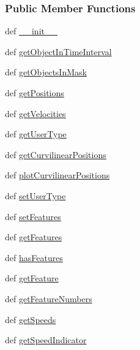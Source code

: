 \subsubsection*{Public Member Functions}
\begin{DoxyCompactItemize}
\item 
def \hyperlink{classmoving_1_1MovingObject_af5eb39b451844c27efa5a9afe6b442b0}{\-\_\-\-\_\-init\-\_\-\-\_\-}
\item 
def \hyperlink{classmoving_1_1MovingObject_a473f6a4eca09148db88439bd062a6802}{get\-Object\-In\-Time\-Interval}
\item 
def \hyperlink{classmoving_1_1MovingObject_a8725b010f6aa48dbc0b07b6714f15403}{get\-Objects\-In\-Mask}
\item 
def \hyperlink{classmoving_1_1MovingObject_a9c70c0c7dc3c938e70e6e4434f61b167}{get\-Positions}
\item 
def \hyperlink{classmoving_1_1MovingObject_a95c34c471a8f4f001e009c9ea5aed13b}{get\-Velocities}
\item 
def \hyperlink{classmoving_1_1MovingObject_a757700e17e0b75bb01e6b7324a3d5bdc}{get\-User\-Type}
\item 
def \hyperlink{classmoving_1_1MovingObject_aa589676e00e70ce8acafca9c3fa48150}{get\-Curvilinear\-Positions}
\item 
def \hyperlink{classmoving_1_1MovingObject_a8bff58ea20311713f7d08e1ed5482af6}{plot\-Curvilinear\-Positions}
\item 
def \hyperlink{classmoving_1_1MovingObject_a5b1caff7786c65076d09d79caec37f64}{set\-User\-Type}
\item 
def \hyperlink{classmoving_1_1MovingObject_aac41a9e6cf22cb70e5c9928322162e8b}{set\-Features}
\item 
def \hyperlink{classmoving_1_1MovingObject_a44af98d08a6ce2e6f09744abbf11e775}{get\-Features}
\item 
def \hyperlink{classmoving_1_1MovingObject_a971cfddbae99bd4ec26a1734f4e3cd4d}{has\-Features}
\item 
def \hyperlink{classmoving_1_1MovingObject_a398d9645b1ff68dc872f1d4bb7741ea3}{get\-Feature}
\item 
def \hyperlink{classmoving_1_1MovingObject_a70d454a13902eb10b7f5bde7af263c44}{get\-Feature\-Numbers}
\item 
def \hyperlink{classmoving_1_1MovingObject_aab0c83ba184a96a01e20a2e01ebc0afb}{get\-Speeds}
\item 
def \hyperlink{classmoving_1_1MovingObject_ac9edf3740c53ddc68d69fa6747b0c882}{get\-Speed\-Indicator}
\item 

\end{DoxyCompactItemize}
